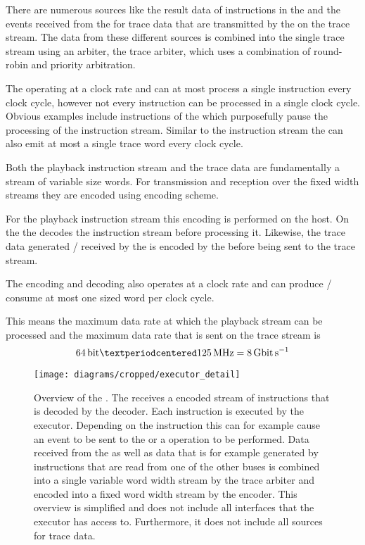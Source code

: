 There are numerous sources like the result data of instructions in the \readCat{} and the events received from the \ASIC{} for trace data that are transmitted by the \pbexec{} on the trace stream. The data from these different sources is combined into the single trace stream using an arbiter, the trace arbiter, which uses a combination of round-robin and priority arbitration.

The \pbexec{} operating at a \pbExecClock{} clock rate and can at most process a single instruction every clock cycle, however not every instruction can be processed in a single clock cycle. Obvious examples include instructions of the \waitCat{} which purposefully pause the processing of the instruction stream. Similar to the instruction stream the \pbexec{} can also emit at most a single trace word every clock cycle.

Both the playback instruction stream and the trace data are fundamentally a stream of variable size words. For transmission and reception over the fixed width \HostARQ{} streams they are encoded using \UT{} encoding scheme\autocite{karasenko2020neumann}.

For the playback instruction stream this encoding is performed on the host. On the \FPGA{} the \pbexec{} decodes the instruction stream before processing it.
Likewise, the trace data generated / received by the \pbexec{} is encoded by the \pbexec{} before being sent to the trace stream.

The encoding and decoding also operates at a \pbExecClock{} clock rate and can produce / consume at most one \PhyWordSize{} sized word per clock cycle.

This means the maximum data rate at which the playback stream can be processed and the maximum data rate that is sent on the trace stream is
\[\PhyWordSize{} · \pbExecClock{} = \pbExecBandwidth{}\]

\begin{figure}
\centerline{\texttt{[image: diagrams/cropped/executor\_detail]}}
\caption{Overview of the \pbexec{}. The \pbexec{} receives a \UT{} encoded stream of instructions that is decoded by the \UT{} decoder. Each instruction is executed by the executor. Depending on the instruction this can for example cause an event to be sent to the \ASIC{} or a \JTAG{} operation to be performed. Data received from the \ASIC{} as well as data that is for example generated by instructions that are read from one of the other \FPGA{} buses is combined into a single variable word width stream by the trace arbiter and encoded into a fixed word width stream by the \UT{} encoder.
This overview is simplified and does not include all interfaces that the executor has access to. Furthermore, it does not include all sources for trace data.}\label{diagram:executor}
\end{figure}

